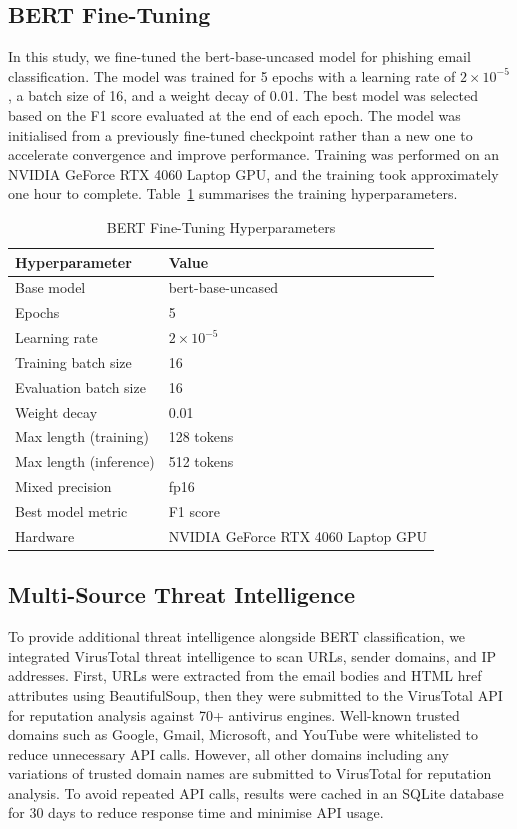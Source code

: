 \documentclass[conference]{IEEEtran}
\begin{document}
\subsection{BERT Fine-Tuning}

In this study, we fine-tuned the bert-base-uncased model for
phishing email classification. The model was trained for 5 epochs
with a learning rate of $2 \times 10^{-5}$, a batch size of 16,
and a weight decay of 0.01. The best model was selected based on
the F1 score evaluated at the end of each epoch. The model was
initialised from a previously fine-tuned checkpoint rather than a
new one to accelerate convergence and improve performance. Training
was performed on an NVIDIA GeForce RTX 4060 Laptop GPU, and the
training took approximately one hour to complete.
Table~\ref{tab:hyperparams} summarises the training
hyperparameters.

\begin{table}[t]
  \centering
  \caption{BERT Fine-Tuning Hyperparameters}
  \label{tab:hyperparams}
  \begin{tabular}{ll}
    \toprule
    \textbf{Hyperparameter} & \textbf{Value} \\
    \midrule
    Base model              & bert-base-uncased \\
    Epochs                  & 5 \\
    Learning rate           & $2 \times 10^{-5}$ \\
    Training batch size     & 16 \\
    Evaluation batch size   & 16 \\
    Weight decay            & 0.01 \\
    Max length (training)   & 128 tokens \\
    Max length (inference)  & 512 tokens \\
    Mixed precision         & fp16 \\
    Best model metric       & F1 score \\
    Hardware                & NVIDIA GeForce RTX 4060 Laptop GPU \\
    \bottomrule
  \end{tabular}
\end{table}

\subsection{Multi-Source Threat Intelligence}

To provide additional threat intelligence alongside BERT
classification, we integrated VirusTotal threat intelligence to
scan URLs, sender domains, and IP addresses. First, URLs were
extracted from the email bodies and HTML href attributes using
BeautifulSoup, then they were submitted to the VirusTotal API for
reputation analysis against 70+ antivirus engines. Well-known
trusted domains such as Google, Gmail, Microsoft, and YouTube were
whitelisted to reduce unnecessary API calls. However, all other
domains including any variations of trusted domain names are
submitted to VirusTotal for reputation analysis. To avoid repeated
API calls, results were cached in an SQLite database for 30 days
to reduce response time and minimise API usage.
\end{document}
